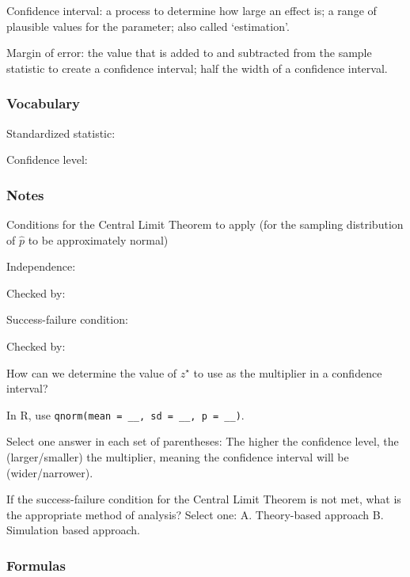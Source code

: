 \documentclass[
]{report}
\newcommand{\rgs}{\vspace{12pt}} %
\newcommand{\rgi}{\hspace{24pt}}  %
\begin{document}
Confidence interval: a process to determine how large an effect is; a range of plausible values for the parameter; also called `estimation'.

Margin of error: the value that is added to and subtracted from the sample statistic to create a confidence interval; half the width of a confidence interval.

\hypertarget{vocabulary-13}{%
\subsubsection*{Vocabulary}\label{vocabulary-13}}

Standardized statistic:
\rgs

Confidence level:
\rgs

\hypertarget{notes-17}{%
\subsubsection*{Notes}\label{notes-17}}

Conditions for the Central Limit Theorem to apply (for the sampling distribution of \(\hat{p}\) to be approximately normal)

\rgi Independence:
\rgs

\rgi \rgi Checked by:
\rgs

\rgi Success-failure condition:
\rgs

\rgi \rgi Checked by:
\rgs

How can we determine the value of \(z^⋆\) to use as the multiplier in a confidence interval?
\rgs

\rgi In R, use \texttt{qnorm(mean\ =\ \_\_,\ sd\ =\ \_\_,\ p\ =\ \_\_)}.

Select one answer in each set of parentheses: The higher the confidence level, the (larger/smaller) the multiplier, meaning the confidence interval will be (wider/narrower).

If the success-failure condition for the Central Limit Theorem is not met, what is the appropriate method of analysis? Select one:
\rgi A. Theory-based approach
\rgi B. Simulation based approach.

\hypertarget{formulas-2}{%
\subsubsection*{Formulas}\label{formulas-2}}
\end{document}
